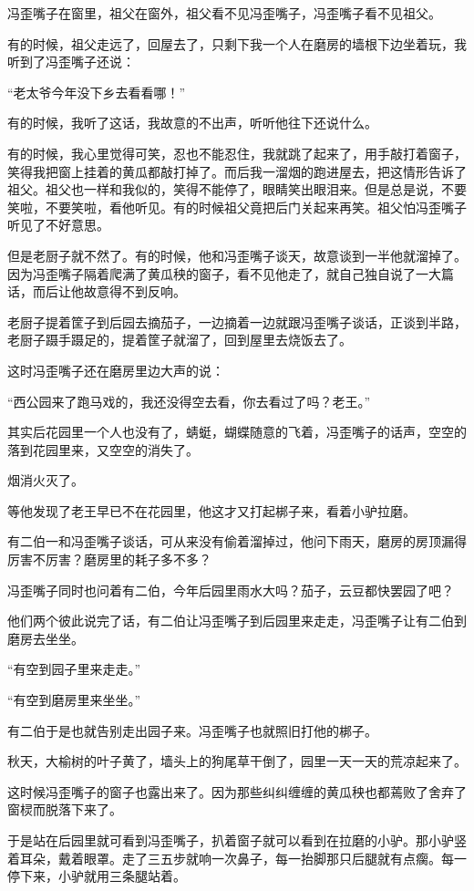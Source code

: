 \par 冯歪嘴子在窗里，祖父在窗外，祖父看不见冯歪嘴子，冯歪嘴子看不见祖父。
\par 有的时候，祖父走远了，回屋去了，只剩下我一个人在磨房的墙根下边坐着玩，我听到了冯歪嘴子还说：
\par “老太爷今年没下乡去看看哪！”
\par 有的时候，我听了这话，我故意的不出声，听听他往下还说什么。
\par 有的时候，我心里觉得可笑，忍也不能忍住，我就跳了起来了，用手敲打着窗子，笑得我把窗上挂着的黄瓜都敲打掉了。而后我一溜烟的跑进屋去，把这情形告诉了祖父。祖父也一样和我似的，笑得不能停了，眼睛笑出眼泪来。但是总是说，不要笑啦，不要笑啦，看他听见。有的时候祖父竟把后门关起来再笑。祖父怕冯歪嘴子听见了不好意思。
\par 但是老厨子就不然了。有的时候，他和冯歪嘴子谈天，故意谈到一半他就溜掉了。因为冯歪嘴子隔着爬满了黄瓜秧的窗子，看不见他走了，就自己独自说了一大篇话，而后让他故意得不到反响。
\par 老厨子提着筐子到后园去摘茄子，一边摘着一边就跟冯歪嘴子谈话，正谈到半路，老厨子蹑手蹑足的，提着筐子就溜了，回到屋里去烧饭去了。
\par 这时冯歪嘴子还在磨房里边大声的说：
\par “西公园来了跑马戏的，我还没得空去看，你去看过了吗？老王。”
\par 其实后花园里一个人也没有了，蜻蜓，蝴蝶随意的飞着，冯歪嘴子的话声，空空的落到花园里来，又空空的消失了。
\par 烟消火灭了。
\par 等他发现了老王早已不在花园里，他这才又打起梆子来，看着小驴拉磨。
\par 有二伯一和冯歪嘴子谈话，可从来没有偷着溜掉过，他问下雨天，磨房的房顶漏得厉害不厉害？磨房里的耗子多不多？
\par 冯歪嘴子同时也问着有二伯，今年后园里雨水大吗？茄子，云豆都快罢园了吧？
\par 他们两个彼此说完了话，有二伯让冯歪嘴子到后园里来走走，冯歪嘴子让有二伯到磨房去坐坐。
\par “有空到园子里来走走。”
\par “有空到磨房里来坐坐。”
\par 有二伯于是也就告别走出园子来。冯歪嘴子也就照旧打他的梆子。
\par 秋天，大榆树的叶子黄了，墙头上的狗尾草干倒了，园里一天一天的荒凉起来了。
\par 这时候冯歪嘴子的窗子也露出来了。因为那些纠纠缠缠的黄瓜秧也都蔫败了舍弃了窗棂而脱落下来了。
\par 于是站在后园里就可看到冯歪嘴子，扒着窗子就可以看到在拉磨的小驴。那小驴竖着耳朵，戴着眼罩。走了三五步就响一次鼻子，每一抬脚那只后腿就有点瘸。每一停下来，小驴就用三条腿站着。
